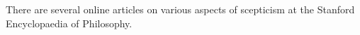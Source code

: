 \documentclass[14pt,titlepage]{extarticle}
\begin{document}
There are several online articles on various aspects of scepticism at the Stanford Encyclopaedia of Philosophy.
















\end{document}
